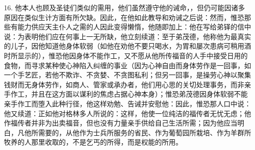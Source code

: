 16. 他本人也顾及圣徒们类似的需用，他们虽然遵守他的诫命，，但仍可能因诸多原因在类似生计方面有所欠缺。因此，在他如此教导和劝诫之后说：然而，惟恐那些有能力供应天主仆人之需的人因此变得懒惰，他随即加上：他在写给弟铎的信中说：为表明他们应在何事上一无所缺，他立刻续道：至于弟茂德，他称他为最真实的儿子，因他知道他身体软弱（如他在劝他不要只喝水，为胃和屡次患病可稍用酒时所显示的），惟恐他因身体不能作工，又不愿从他所传福音的人手中接受日用的食物，而寻求某种使心神陷入纠缠的事业（因为心神自由而身体劳作是一回事，如一个手艺匠，若他不欺诈、不贪婪、不贪图私利；但另一回事，是操劳心神以聚集钱财而无身体劳作，如商人、管家或承办者，他们用心思的关切处理事务，而非亲手作工，并且在这方面以谋利的焦虑占据心神本身）；惟恐弟茂德因身体软弱不能亲手作工而堕入此种行径，他这样劝勉、告诫并安慰他：因此，惟恐那人口中说：他又续道：正如他对格林多人所说的：这样，他使一位纯洁的福传者无忧无虑；他作福传者并非为出卖福音，但也没有力量亲手供给自己生活所需；因为他应当明白，凡他所需要的，从他作为士兵所服务的省民、作为葡萄园所栽培、作为羊群所牧养的人那里收取的，不是乞丐的所得，而是权能的所用。\par

